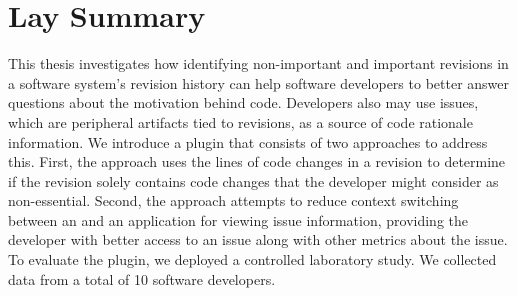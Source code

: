 

\chapter{Lay Summary}

This thesis investigates how identifying non-important and important 
revisions in a software system's revision history can help 
software developers to better answer questions about the motivation behind code.
Developers also may use issues, which are peripheral artifacts tied to revisions, 
as a source of code rationale information.
We introduce a plugin that consists of two approaches to address this.
First, the approach uses the lines of code changes in a revision
to determine if the revision solely contains code changes that the developer
might consider as non-essential.
Second, the approach attempts to reduce context switching between an 
and an application for viewing issue information, providing the developer with
better access to an issue along with other metrics about the issue.
To evaluate the plugin, we deployed a controlled laboratory study.
We collected data from a total of 10 software developers.